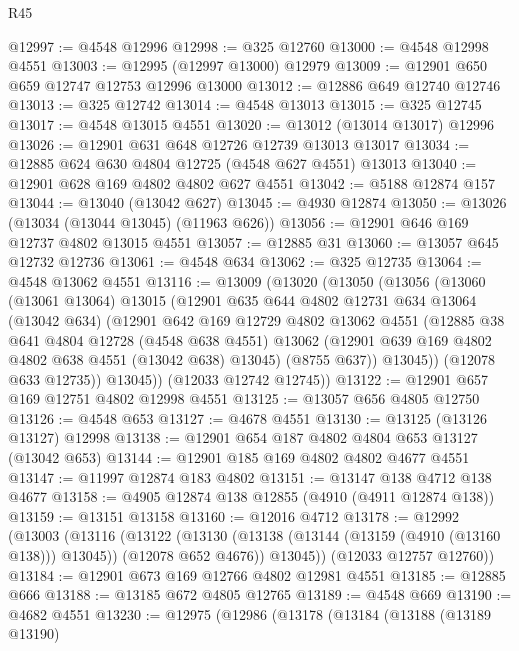 \begin{lexlean}{R45}
\begin{coremodule}
@12997 := @4548 @12996
@12998 := @325 @12760
@13000 := @4548 @12998 @4551
@13003 := @12995 (@12997 @13000) @12979
@13009 := @12901 @650 @659 @12747 @12753 @12996 @13000
@13012 := @12886 @649 @12740 @12746
@13013 := @325 @12742
@13014 := @4548 @13013
@13015 := @325 @12745
@13017 := @4548 @13015 @4551
@13020 := @13012 (@13014 @13017) @12996
@13026 := @12901 @631 @648 @12726 @12739 @13013 @13017
@13034 := @12885 @624 @630 @4804 @12725 (@4548 @627 @4551) @13013
@13040 := @12901 @628 @169 @4802 @4802 @627 @4551
@13042 := @5188 @12874 @157
@13044 := @13040 (@13042 @627)
@13045 := @4930 @12874
@13050 := @13026 (@13034 (@13044 @13045) (@11963 @626))
@13056 := @12901 @646 @169 @12737 @4802 @13015 @4551
@13057 := @12885 @31
@13060 := @13057 @645 @12732 @12736
@13061 := @4548 @634
@13062 := @325 @12735
@13064 := @4548 @13062 @4551
@13116 := @13009
    (@13020
      (@13050
        (@13056
          (@13060
            (@13061 @13064)
            @13015
            (@12901
              @635
              @644
              @4802
              @12731
              @634
              @13064
              (@13042 @634)
              (@12901
                @642
                @169
                @12729
                @4802
                @13062
                @4551
                (@12885
                  @38
                  @641
                  @4804
                  @12728
                  (@4548 @638 @4551)
                  @13062
                  (@12901 @639 @169 @4802 @4802 @638 @4551 (@13042 @638) @13045)
                  (@8755 @637))
                @13045))
            (@12078 @633 @12735))
          @13045))
      (@12033 @12742 @12745))
@13122 := @12901 @657 @169 @12751 @4802 @12998 @4551
@13125 := @13057 @656 @4805 @12750
@13126 := @4548 @653
@13127 := @4678 @4551
@13130 := @13125 (@13126 @13127) @12998
@13138 := @12901 @654 @187 @4802 @4804 @653 @13127 (@13042 @653)
@13144 := @12901 @185 @169 @4802 @4802 @4677 @4551
@13147 := @11997 @12874 @183 @4802
@13151 := @13147 @138 @4712 @138 @4677
@13158 := @4905 @12874 @138 @12855 (@4910 (@4911 @12874 @138))
@13159 := @13151 @13158
@13160 := @12016 @4712
@13178 := @12992
    (@13003
      (@13116
        (@13122
          (@13130 (@13138 (@13144 (@13159 (@4910 (@13160 @138))) @13045)) (@12078 @652 @4676))
          @13045))
      (@12033 @12757 @12760))
@13184 := @12901 @673 @169 @12766 @4802 @12981 @4551
@13185 := @12885 @666
@13188 := @13185 @672 @4805 @12765
@13189 := @4548 @669
@13190 := @4682 @4551
@13230 := @12975
    (@12986
      (@13178
        (@13184
          (@13188
            (@13189 @13190)

\end{coremodule}
\end{lexlean}
